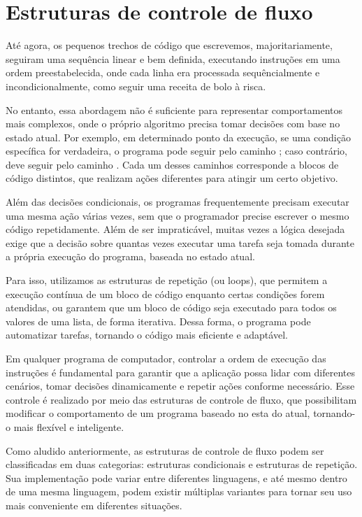 \chapter{Estruturas de controle de fluxo}\label{iffor}

Até agora, os pequenos trechos de código que escrevemos, majoritariamente, seguiram uma sequência linear e
bem definida, executando instruções em uma ordem preestabelecida, onde cada linha era processada
sequêncialmente e incondicionalmente, como seguir uma receita de bolo à risca.

No entanto, essa abordagem não é suficiente para representar comportamentos mais complexos, onde o próprio algoritmo
precisa tomar decisões com base no estado atual.
Por exemplo, em determinado ponto da execução, se uma condição específica for verdadeira, o programa pode seguir
pelo caminho ; caso contrário, deve seguir pelo caminho .
Cada um desses caminhos corresponde a blocos de código distintos, que realizam ações diferentes para atingir um
certo objetivo.


Além das decisões condicionais, os programas frequentemente precisam executar uma mesma ação várias vezes, sem que o
programador precise escrever o mesmo código repetidamente.
Além de ser impraticável, muitas vezes a lógica desejada exige que a decisão sobre quantas vezes executar uma tarefa
seja tomada durante a própria execução do programa, baseada no estado atual.

Para isso, utilizamos as estruturas de repetição (ou loops), que permitem a execução contínua de um bloco de código
enquanto certas condições forem atendidas, ou garantem que um bloco de código seja executado para todos os valores
de uma lista, de forma iterativa.
Dessa forma, o programa pode automatizar tarefas, tornando o código mais eficiente e adaptável.

Em qualquer programa de computador, controlar a ordem de execução das instruções é fundamental para garantir que a
aplicação possa lidar com diferentes cenários, tomar decisões dinamicamente e repetir ações conforme necessário.
Esse controle é realizado por meio das estruturas de controle de fluxo, que possibilitam modificar o comportamento
de um programa baseado no esta do atual, tornando-o mais flexível e inteligente.

Como aludido anteriormente, as estruturas de controle de fluxo podem ser classificadas em duas categorias: estruturas
condicionais e estruturas de repetição.
Sua implementação pode variar entre diferentes linguagens, e até mesmo dentro
de uma mesma linguagem, podem existir múltiplas variantes para tornar seu uso mais conveniente em diferentes situações.


